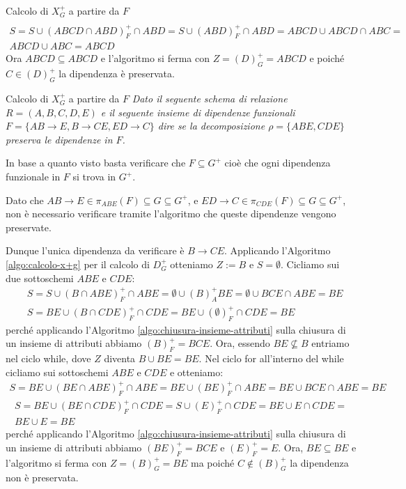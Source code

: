\begin{enumerate}
\begin{Example}{Calcolo di $X^+_G$ a partire da $F$}{}
\begin{align*}
        \end{align*}\vspace{-0.7cm}
        \begin{align*}
            S=S\cup (ABCD\cap ABD)^+_F\cap ABD=S\cup (ABD)^+_F\cap ABD=ABCD\cup ABCD\cap ABC=\\ABCD\cup ABC=ABCD
        \end{align*}
        Ora $ABCD\subseteq ABCD$ e l'algoritmo si ferma con $Z=(D)^+_G=ABCD$ e poiché $C\in (D)^+_G$ la dipendenza è preservata.
    \end{Example}

    \begin{Example}{Calcolo di $X^+_G$ a partire da $F$}{}
        \textit{Dato il seguente schema di relazione $R = (A, B, C, D, E)$ e il seguente insieme di dipendenze funzionali $F = \{AB\to E, B\to CE, ED\to C\}$ dire se la decomposizione $\rho = \{ ABE,CDE \}$ preserva le dipendenze in $F$.}

        In base a quanto visto basta verificare che $F\subseteq G^+$ cioè che ogni dipendenza funzionale in $F$ si trova in $G^+$.

        Dato che $AB\to E\in \pi_{ABE}(F)\subseteq G\subseteq G^+$, e $ED\to C\in \pi_{CDE}(F)\subseteq G\subseteq G^+$, non è necessario verificare tramite l'algoritmo che queste dipendenze vengono preservate.

        Dunque l'unica dipendenza da verificare è $B\to CE$. Applicando l'Algoritmo \ref{algo:calcolo-x+g} per il calcolo di $D^+_G$ otteniamo $Z:=B$ e $S=\emptyset$. Cicliamo sui due sottoschemi $ABE$ e $CDE$:
        \begin{align*}
            &S=S\cup(B\cap ABE)^+_F\cap ABE=\emptyset\cup(B)^+_ABE=\emptyset\cup BCE\cap ABE=BE\\
            &S=BE\cup (B\cap CDE)^+_F\cap CDE=BE\cup (\emptyset)^+_F\cap CDE=BE
        \end{align*}
        perché applicando l'Algoritmo \ref{algo:chiusura-insieme-attributi} sulla chiusura di un insieme di attributi abbiamo $(B)^+_F=BCE$. Ora, essendo $BE\not\subseteq B$ entriamo nel ciclo while, dove $Z$ diventa $B\cup BE=BE$. Nel ciclo for all'interno del while cicliamo sui sottoschemi $ABE$ e $CDE$ e otteniamo:
        \begin{align*}
            S=BE\cup(BE\cap ABE)^+_F\cap ABE=BE\cup (BE)^+_F\cap ABE=BE\cup BCE\cap ABE=BE
        \end{align*}\vspace{-1cm}
        \begin{align*}
            S=BE\cup (BE\cap CDE)^+_F\cap CDE=S\cup (E)^+_F\cap CDE=BE\cup E\cap CDE=\\BE\cup E=BE
        \end{align*}
        perché applicando l'Algoritmo \ref{algo:chiusura-insieme-attributi} sulla chiusura di un insieme di attributi abbiamo $(BE)^+_F=BCE$ e $(E)^+_F=E$. Ora, $BE\subseteq BE$ e l'algoritmo si ferma con $Z=(B)^+_G=BE$ ma poiché $C\notin (B)^+_G$ la dipendenza non è preservata.
    \end{Example}


\end{enumerate}
